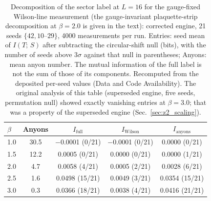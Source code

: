 \documentclass[aps,pra,twocolumn,superscriptaddress,showpacs,floatfix]{revtex4-2}
\newcommand{\MI}{I(T;\,S)}
\begin{document}
\begin{table}[b]
\caption{Decomposition of the sector label at $L = 16$ for the gauge-fixed Wilson-line measurement (the gauge-invariant plaquette-strip decomposition at $\beta = 2.0$ is given in the text): corrected engine, 21 seeds $\{42, 10\text{--}29\}$, 4000 measurements per run. Entries: seed mean of $\MI$ after subtracting the circular-shift null (bits), with the number of seeds above $3\sigma$ against that null in parentheses; Anyons: mean anyon number. The mutual information of the full label is not the sum of those of its components. Recomputed from the deposited per-seed values (Data and Code Availability). The original analysis of this table (superseded engine, five seeds, permutation null) showed exactly vanishing entries at $\beta = 3.0$; that was a property of the superseded engine (Sec.~\ref{sec:z2_scaling}).}
\label{tab:crossover}
\begin{ruledtabular}
\begin{tabular}{lcccc}
$\beta$ & Anyons & $I_\mathrm{full}$ & $I_\mathrm{Wilson}$ & $I_\mathrm{anyons}$ \\
\midrule
1.0 & 30.5 & $-$0.0001 (0/21) & $-$0.0001 (0/21) & 0.0000 (0/21) \\
1.5 & 12.2 & 0.0005 (0/21) & 0.0000 (0/21) & 0.0000 (1/21) \\
2.0 &  4.7 & 0.0058 (4/21) & 0.0005 (2/21) & 0.0028 (6/21) \\
2.5 &  1.6 & 0.0498 (15/21) & 0.0049 (3/21) & 0.0354 (15/21) \\
3.0 &  0.3 & 0.0366 (18/21) & 0.0038 (4/21) & 0.0416 (21/21) \\
\end{tabular}
\end{ruledtabular}
\end{table}
\end{document}
